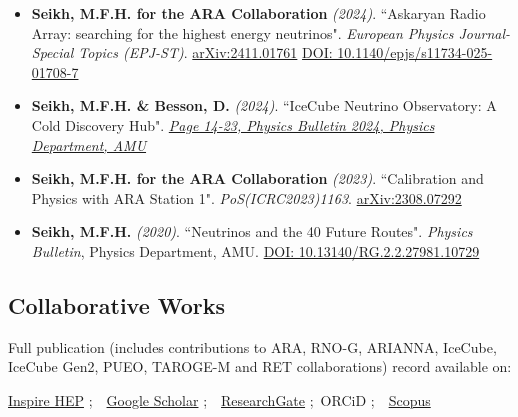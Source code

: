 \documentclass[10pt]{report}
\begin{document}
\begin{itemize}
    \vspace{0.1em}
    \noindent
    \item \textbf{Seikh, M.F.H. for the ARA Collaboration} {\it (2024)}. ``Askaryan Radio Array: searching for the highest energy neutrinos". \textit{European Physics Journal-Special Topics (EPJ-ST)}. \href{https://arxiv.org/abs/2411.01761}{arXiv:2411.01761} \href{https://doi.org/10.1140/epjs/s11734-025-01708-7}{DOI: 10.1140/epjs/s11734-025-01708-7}

    \vspace{0.1em}
    \noindent
    \item \textbf{Seikh, M.F.H. \& Besson, D.} {\it (2024)}. ``IceCube Neutrino Observatory: A Cold Discovery Hub". \href{https://drive.google.com/file/d/1q1vm4tf2Z8iK_Iw3n3kVayBnP7K6tHQI/view?usp=sharing}{\textit{Page 14-23, Physics Bulletin 2024, Physics Department, AMU}}

    \vspace{0.1em}
    \noindent
    \item \textbf{Seikh, M.F.H. for the ARA Collaboration} {\it (2023)}. ``Calibration and Physics with ARA Station 1". \textit{PoS(ICRC2023)1163}. \href{https://arxiv.org/abs/2308.07292}{arXiv:2308.07292}
    
    \vspace{0.1em}
    \noindent    
    \item \textbf{Seikh, M.F.H.} {\it (2020)}. ``Neutrinos and the 40 Future Routes". \textit{Physics Bulletin}, Physics Department, AMU. \href{https://www.researchgate.net/publication/340272190_Neutrinos_and_the_40_Future_Routes}{DOI: 10.13140/RG.2.2.27981.10729}
\end{itemize}

\subsection*{Collaborative Works}
Full publication (includes contributions to ARA, RNO-G, ARIANNA, IceCube, IceCube Gen2, PUEO, TAROGE-M and RET collaborations) record available on:
\begin{center}
    \href{https://inspirehep.net/authors/2014116}{Inspire HEP} ;~~\href{https://scholar.google.com/citations?user=dSwfpWQAAAAJ}{Google Scholar} ;~~\href{https://www.researchgate.net/profile/Mohammad-Ful-Hossain-Seikh}{ResearchGate} ;~ORCiD  ;~~\href{https://www.scopus.com/authid/detail.uri?authorId=57426893600}{Scopus}
\end{center}
\end{document}
